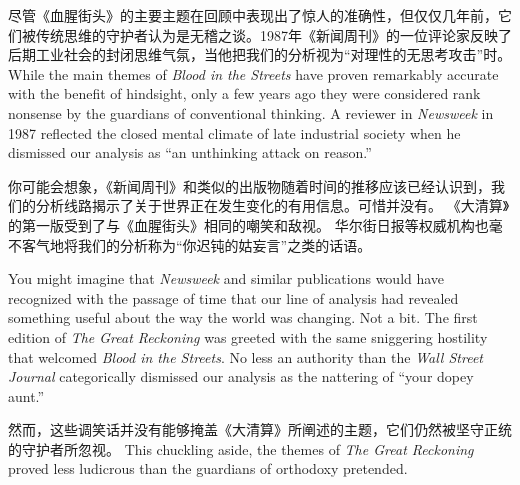 \begin{paracol}{2}
\switchcolumn*
尽管《血腥街头》的主要主题在回顾中表现出了惊人的准确性，但仅仅几年前，它们被传统思维的守护者认为是无稽之谈。1987年《新闻周刊》的一位评论家反映了后期工业社会的封闭思维气氛，当他把我们的分析视为“对理性的无思考攻击”时。
\switchcolumn
While the main themes of \emph{Blood in the Streets} have proven remarkably accurate with the benefit of hindsight, only a few years ago they were considered rank nonsense by the guardians of conventional thinking. A reviewer in \emph{Newsweek} in 1987 reflected the closed mental climate of late industrial society when he dismissed our analysis as ``an unthinking attack on reason.''

\switchcolumn*
你可能会想象，《新闻周刊》和类似的出版物随着时间的推移应该已经认识到，我们的分析线路揭示了关于世界正在发生变化的有用信息。可惜并没有。 《大清算》的第一版受到了与《血腥街头》相同的嘲笑和敌视。 华尔街日报等权威机构也毫不客气地将我们的分析称为“你迟钝的姑妄言”之类的话语。

\switchcolumn
You might imagine that \emph{Newsweek} and similar publications would have recognized with the passage of time that our line of analysis had revealed something useful about the way the world was changing. Not a bit. The first edition of \emph{The Great Reckoning} was greeted with the same sniggering hostility that welcomed \emph{Blood in the Streets}. No less an authority than the \emph{Wall Street Journal} categorically dismissed our analysis as the nattering of ``your dopey aunt.'' 

\switchcolumn*
然而，这些调笑话并没有能够掩盖《大清算》所阐述的主题，它们仍然被坚守正统的守护者所忽视。
\switchcolumn
This chuckling aside, the themes of \emph{The Great Reckoning} proved less ludicrous than the guardians of orthodoxy pretended.


\end{paracol}
